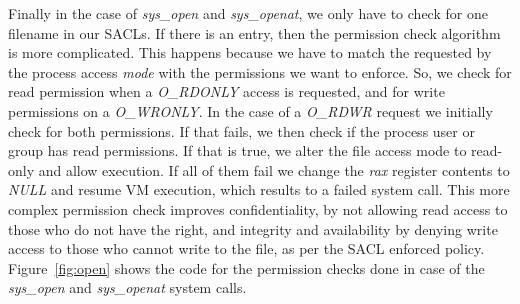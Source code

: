 \par Finally in the case of \textit{sys\_open} and \textit{sys\_openat}, we only have to check for one filename in our \ac{SACL}s. If there is an entry, then the permission check algorithm is more complicated. This happens because we have to match the requested by the process access \textit{mode} with the permissions we want to enforce. So, we check for read permission when a \textit{O\_RDONLY} access is requested, and for write permissions on a \textit{O\_WRONLY}. In the case of a \textit{O\_RDWR} request we initially check for both permissions. If that fails, we then check if the process user or group has read permissions. If that is true, we alter the file access mode to read-only and allow execution. If all of them fail we change the \textit{rax} register contents to \textit{NULL} and resume \ac{VM} execution, which results to a failed system call. This more complex permission check improves confidentiality, by not allowing read access to those who do not have the right, and integrity and availability by denying write access to those who cannot write to the file, as per the \ac{SACL} enforced policy. Figure~\ref{fig:open} shows the code for the permission checks done in case of the \textit{sys\_open} and \textit{sys\_openat} system calls.











